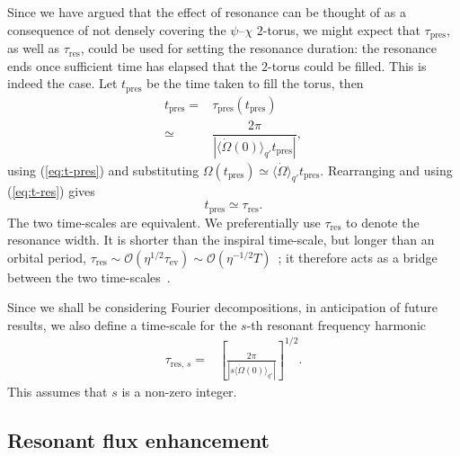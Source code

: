 \documentclass[aps,prd,amsfonts,amssymb,amsmath,nofootinbib,reprint,showpacs,superscriptaddress,twocolumn]{revtex4}
\newcommand{\eqnref}[1]{(\ref{eq:#1})}
\newcommand{\sub}[1]{\ensuremath{_\text{#1}}}
\newcommand{\order}[1]{\ensuremath{\mathcal{O}({#1})}}
\begin{document}
Since we have argued that the effect of resonance can be thought of as a consequence of not densely covering the $\psi$--$\chi$ $2$-torus, we might expect that $\tau\sub{pres}$, as well as $\tau\sub{res}$, could be used for setting the resonance duration: the resonance ends once sufficient time has elapsed that the $2$-torus could be filled. This is indeed the case. Let $t\sub{pres}$ be the time taken to fill the torus, then
\begin{align}
t\sub{pres} = {} & \tau\sub{pres}(t\sub{pres}) \\
 \simeq {} & \dfrac{2\pi}{\left|\langle\dot{\Omega}(0)\rangle_{q'} t\sub{pres}\right|}, \nonumber 
\end{align}
using \eqnref{t-pres} and substituting $\Omega(t\sub{pres}) \simeq \langle\dot{\Omega}\rangle_{q'} t\sub{pres}$. Rearranging and using \eqnref{t-res} gives
\begin{equation}
t\sub{pres} \simeq \tau\sub{res}.
\end{equation}
The two time-scales are equivalent. We preferentially use $\tau\sub{res}$ to denote the resonance width. It is shorter than the inspiral time-scale, but longer than an orbital period, $\tau\sub{res} \sim \order{\eta^{1/2}\tau\sub{ev}} \sim \order{\eta^{-1/2}T}$~\cite{Flanagan2012,Gair2011a}; it therefore acts as a bridge between the two time-scales~\cite{Hinderer2008}.

Since we shall be considering Fourier decompositions, in anticipation of future results, we also define a time-scale for the $s$-th resonant frequency harmonic
\begin{align}
\tau_{\mathrm{res},\,s} = {} & \left[\frac{2\pi}{\left|s\langle \dot{\Omega}(0)\rangle_{q'}\right|}\right]^{1/2}.
\label{eq:T-res-s}
\end{align}
This assumes that $s$ is a non-zero integer.

\subsection{Resonant flux enhancement}
\end{document}
